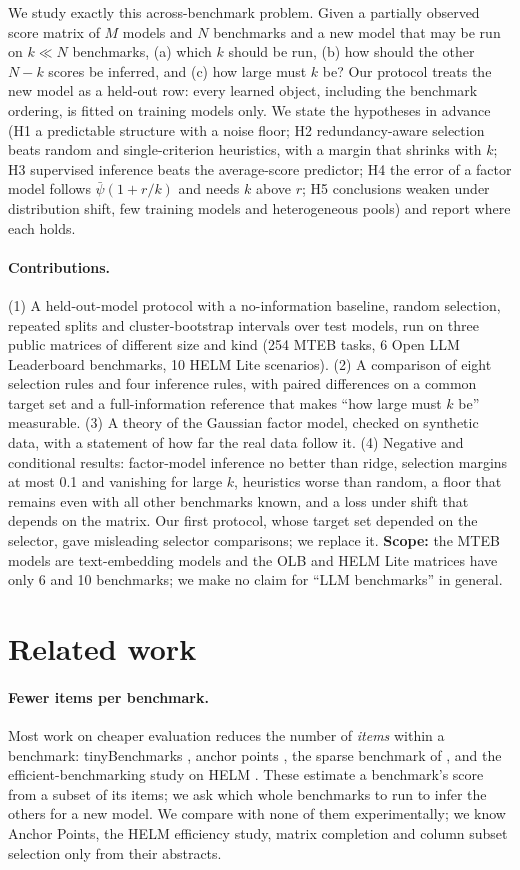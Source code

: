 \documentclass{article}
\begin{document}
We study exactly this across-benchmark problem. Given a partially observed score matrix of $M$ models and $N$ benchmarks and a new model that may be run on $k\ll N$ benchmarks, (a) which $k$ should be run, (b) how should the other $N-k$ scores be inferred, and (c) how large must $k$ be? Our protocol treats the new model as a held-out row: every learned object, including the benchmark ordering, is fitted on training models only. We state the hypotheses in advance (H1 a predictable structure with a noise floor; H2 redundancy-aware selection beats random and single-criterion heuristics, with a margin that shrinks with $k$; H3 supervised inference beats the average-score predictor; H4 the error of a factor model follows $\bar\psi(1+r/k)$ and needs $k$ above $r$; H5 conclusions weaken under distribution shift, few training models and heterogeneous pools) and report where each holds.

\paragraph{Contributions.} (1) A held-out-model protocol with a no-information baseline, random selection, repeated splits and cluster-bootstrap intervals over test models, run on three public matrices of different size and kind (254 MTEB tasks, 6 Open LLM Leaderboard benchmarks, 10 HELM Lite scenarios). (2) A comparison of eight selection rules and four inference rules, with paired differences on a common target set and a full-information reference that makes ``how large must $k$ be'' measurable. (3) A theory of the Gaussian factor model, checked on synthetic data, with a statement of how far the real data follow it. (4) Negative and conditional results: factor-model inference no better than ridge, selection margins at most 0.1 and vanishing for large $k$, heuristics worse than random, a floor that remains even with all other benchmarks known, and a loss under shift that depends on the matrix. Our first protocol, whose target set depended on the selector, gave misleading selector comparisons; we replace it. \textbf{Scope:} the MTEB models are text-embedding models and the OLB and HELM Lite matrices have only 6 and 10 benchmarks; we make no claim for ``LLM benchmarks'' in general.

\section{Related work}
\label{sec:related}
\paragraph{Fewer items per benchmark.} Most work on cheaper evaluation reduces the number of \emph{items} within a benchmark: tinyBenchmarks \citep{polo2024tinybenchmarks}, anchor points \citep{vivek2023anchor}, the sparse benchmark of \citet{kipnis2024metabench}, and the efficient-benchmarking study on HELM \citep{perlitz2023efficient}. These estimate a benchmark's score from a subset of its items; we ask which whole benchmarks to run to infer the others for a new model. We compare with none of them experimentally; we know Anchor Points, the HELM efficiency study, matrix completion and column subset selection only from their abstracts.
\end{document}
